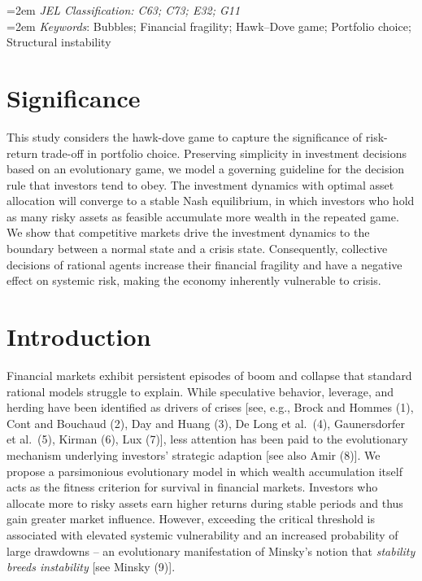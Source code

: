 \documentclass[11pt,a4paper]{article}
\begin{document}
\phantom{} \hangindent=2em 
\textit{JEL Classification: C63; C73; E32; G11} \\
\hangindent=2em 
\textit{Keywords}: Bubbles; Financial fragility; Hawk--Dove game; Portfolio choice; Structural instability 


\newpage 
\section*{Significance}

This study considers the hawk-dove game to capture the significance of risk-return trade-off in portfolio choice. Preserving simplicity in investment decisions based on an evolutionary game, we model a governing guideline for the decision rule that investors tend to obey. The investment dynamics with optimal asset allocation will converge to a stable Nash equilibrium, in which investors who hold as many risky assets as feasible accumulate more wealth in the repeated game. We show that competitive markets drive the investment dynamics to the boundary between a normal state and a crisis state. Consequently, collective decisions of rational agents increase their financial fragility and have a negative effect on systemic risk, making the economy inherently vulnerable to crisis. %

\section{Introduction}

Financial markets exhibit persistent episodes of boom and collapse that standard rational models struggle to explain. While speculative behavior, leverage, and herding have been identified as drivers of crises [see, e.g., Brock and Hommes (1), Cont and Bouchaud (2), Day and Huang (3), De Long et al.\ (4), Gaunersdorfer et al.\ (5), Kirman (6), Lux (7)], less attention has been paid to the evolutionary mechanism underlying investors' strategic adaption [see also Amir (8)]. We propose a parsimonious evolutionary model in which wealth accumulation itself acts as the fitness criterion for survival in financial markets. Investors who allocate more to risky assets earn higher returns during stable periods and thus gain greater market influence. However, exceeding the critical threshold is associated with elevated systemic vulnerability and an increased probability of large drawdowns -- an evolutionary manifestation of Minsky's notion that \textit{stability breeds instability} [see Minsky (9)].
\end{document}
